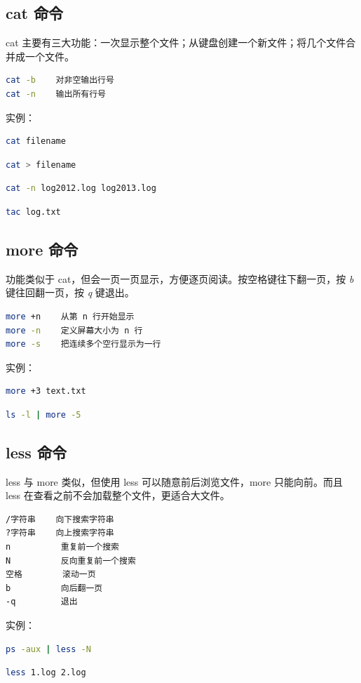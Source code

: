 \documentclass[12pt,a4paper]{ctexbook}
\begin{document}
\subsection{cat 命令}
cat 主要有三大功能：一次显示整个文件；从键盘创建一个新文件；将几个文件合并成一个文件。
\begin{lstlisting}[language=bash,title={cat 常用参数}]
cat -b    对非空输出行号
cat -n    输出所有行号
\end{lstlisting}
实例：
\begin{lstlisting}[language=bash,title={一次显示整个文件}]
    cat filename
\end{lstlisting}
\begin{lstlisting}[language=bash,title={从键盘创建一个文件(只能新建, 不能编辑已有文件)}]
    cat > filename
\end{lstlisting}
\begin{lstlisting}[language=bash,title={把 log2012.log 内容加上行号后写进 log2013.log}]
    cat -n log2012.log log2013.log
\end{lstlisting}
\begin{lstlisting}[language=bash,title={反向列示文件(与 cat 相反)}]
    tac log.txt
\end{lstlisting}

\subsection{more 命令}
功能类似于 cat，但会一页一页显示，方便逐页阅读。按空格键往下翻一页，按 \textit{b} 键往回翻一页，按 \textit{q} 键退出。
\begin{lstlisting}[language=bash,title={more 常用参数}]
more +n    从第 n 行开始显示
more -n    定义屏幕大小为 n 行
more -s    把连续多个空行显示为一行
\end{lstlisting}
实例：
\begin{lstlisting}[language=bash,title={显示文件中从第 3 行起的内容}]
    more +3 text.txt
\end{lstlisting}
\begin{lstlisting}[language=bash,title={借助管道让 ls -l 每次只显示 5 行}]
    ls -l | more -5
\end{lstlisting}

\subsection{less 命令}
less 与 more 类似，但使用 less 可以随意前后浏览文件，more 只能向前。而且 less 在查看之前不会加载整个文件，更适合大文件。
\begin{lstlisting}[language=bash,title={less 常用操作}]
/字符串    向下搜索字符串
?字符串    向上搜索字符串
n          重复前一个搜索
N          反向重复前一个搜索
空格        滚动一页
b          向后翻一页
-q         退出
\end{lstlisting}
实例：
\begin{lstlisting}[language=bash,title={查看进程信息并通过 less 分页显示(带行号)}]
    ps -aux | less -N
\end{lstlisting}
\begin{lstlisting}[language=bash,title={查看多个文件(按 n 下一个, p 前一个)}]
    less 1.log 2.log
\end{lstlisting}
\end{document}
